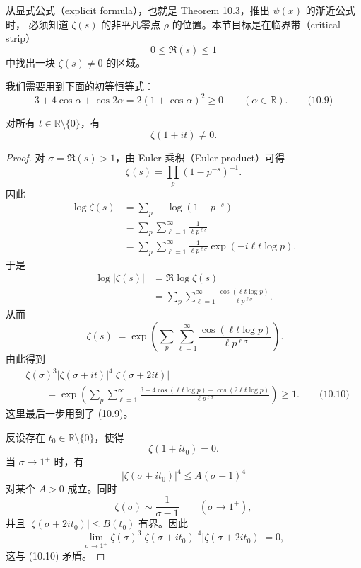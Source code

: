 从显式公式（explicit formula），也就是 Theorem 10.3，推出 $\psi(x)$ 的渐近公式时，
必须知道 $\zeta(s)$ 的非平凡零点 $\rho$ 的位置。本节目标是在临界带（critical strip）
\[
	0\leq \Re(s)\leq 1
\]
中找出一块 $\zeta(s)\neq 0$ 的区域。

我们需要用到下面的初等恒等式：
\begin{equation*}
	3+4\cos\alpha+\cos 2\alpha
	=
	2(1+\cos\alpha)^2
	\geq 0
	\qquad
	(\alpha\in\mathbb R).
	\qquad\text{(10.9)}
\end{equation*}

\begin{theorem}[原文 Theorem 10.4]
	对所有 $t\in\mathbb R\setminus\{0\}$，有
	\[
		\zeta(1+it)\neq 0.
	\]
\end{theorem}

\begin{proof}
	对 $\sigma=\Re(s)>1$，由 Euler 乘积（Euler product）可得
	\[
		\zeta(s)
		=
		\prod_p (1-p^{-s})^{-1}.
	\]
	因此
	\[
	\begin{aligned}
		\log\zeta(s)
		&=
		\sum_p -\log(1-p^{-s}) \\
		&=
		\sum_p\sum_{\ell=1}^{\infty}\frac{1}{\ell p^{\ell s}} \\
		&=
		\sum_p\sum_{\ell=1}^{\infty}
		\frac{1}{\ell p^{\ell\sigma}}
		\exp(-i\ell t\log p).
	\end{aligned}
	\]
	于是
	\[
	\begin{aligned}
		\log|\zeta(s)|
		&=
		\Re\log\zeta(s) \\
		&=
		\sum_p\sum_{\ell=1}^{\infty}
		\frac{\cos(\ell t\log p)}{\ell p^{\ell\sigma}}.
	\end{aligned}
	\]
	从而
	\[
		|\zeta(s)|
		=
		\exp\left(
			\sum_p\sum_{\ell=1}^{\infty}
			\frac{\cos(\ell t\log p)}{\ell p^{\ell\sigma}}
		\right).
	\]
	由此得到
	\begin{equation*}
	\begin{aligned}
		&
		\zeta(\sigma)^3
		|\zeta(\sigma+it)|^4
		|\zeta(\sigma+2it)| \\
		&\qquad=
		\exp\left(
			\sum_p\sum_{\ell=1}^{\infty}
			\frac{
				3+4\cos(\ell t\log p)+\cos(2\ell t\log p)
			}{\ell p^{\ell\sigma}}
		\right)
		\geq 1.
		\qquad\text{(10.10)}
	\end{aligned}
	\end{equation*}
	这里最后一步用到了 (10.9)。

	反设存在 $t_0\in\mathbb R\setminus\{0\}$，使得
	\[
		\zeta(1+it_0)=0.
	\]
	当 $\sigma\to1^+$ 时，有
	\[
		|\zeta(\sigma+it_0)|^4
		\leq
		A(\sigma-1)^4
	\]
	对某个 $A>0$ 成立。同时
	\[
		\zeta(\sigma)\sim\frac1{\sigma-1}
		\qquad(\sigma\to1^+),
	\]
	并且 $|\zeta(\sigma+2it_0)|\leq B(t_0)$ 有界。因此
	\[
		\lim_{\sigma\to1^+}
		\zeta(\sigma)^3
		|\zeta(\sigma+it_0)|^4
		|\zeta(\sigma+2it_0)|
		=
		0,
	\]
	这与 (10.10) 矛盾。
\end{proof}

